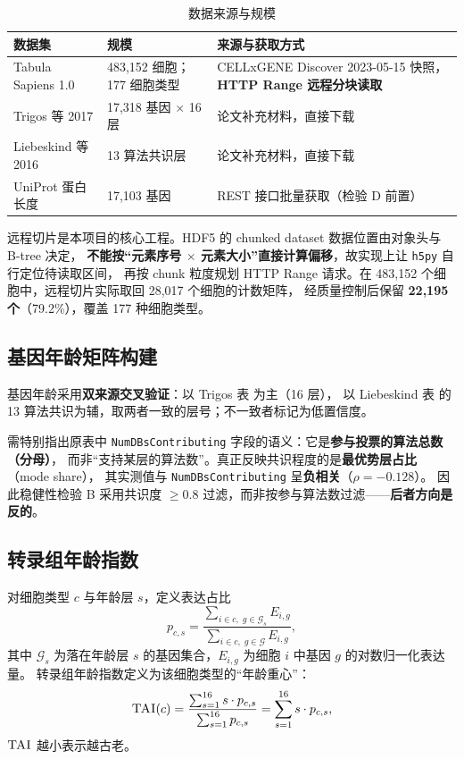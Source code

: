\documentclass[UTF8, a4paper, 11pt]{ctexart}
\newcommand{\tai}{\textsc{TAI}}
\begin{document}
\begin{table}[H]
  \centering
  \caption{数据来源与规模}
  \label{tab:data}
  \small
  \begin{tabularx}{\textwidth}{@{}p{3.0cm}p{3.1cm}X@{}}
    \toprule
    数据集 & 规模 & 来源与获取方式 \\
    \midrule
    Tabula Sapiens 1.0 & 483,152 细胞；177 细胞类型 & CELLxGENE Discover 2023-05-15 快照，\textbf{HTTP Range 远程分块读取}\citep{conservation2020} \\
    Trigos 等 2017 & 17,318 基因 $\times$ 16 层 & 论文补充材料，直接下载\citep{trigos2017} \\
    Liebeskind 等 2016 & 13 算法共识层 & 论文补充材料，直接下载\citep{liebeskind2016} \\
    UniProt 蛋白长度 & 17,103 基因 & REST 接口批量获取（检验 D 前置） \\
    \bottomrule
  \end{tabularx}
\end{table}

远程切片是本项目的核心工程。HDF5 的 chunked dataset 数据位置由对象头与 B-tree 决定，
\textbf{不能按“元素序号 $\times$ 元素大小”直接计算偏移}，故实现上让 \texttt{h5py} 自行定位待读取区间，
再按 chunk 粒度规划 HTTP Range 请求。在 483,152 个细胞中，远程切片实际取回 28,017 个细胞的计数矩阵，
经质量控制后保留 \textbf{22,195 个}（79.2\%），覆盖 177 种细胞类型。

\subsection{基因年龄矩阵构建}

基因年龄采用\textbf{双来源交叉验证}：以 Trigos 表\citep{trigos2017} 为主（16 层），
以 Liebeskind 表\citep{liebeskind2016} 的 13 算法共识为辅，取两者一致的层号；不一致者标记为低置信度。

需特别指出原表中 \texttt{NumDBsContributing} 字段的语义：它是\textbf{参与投票的算法总数（分母）}，
而非“支持某层的算法数”。真正反映共识程度的是\textbf{最优势层占比}（mode share），
其实测值与 \texttt{NumDBsContributing} 呈\textbf{负相关}（$\rho = -0.128$）。
因此稳健性检验 B 采用共识度 $\ge 0.8$ 过滤，而非按参与算法数过滤——\textbf{后者方向是反的}。

\subsection{转录组年龄指数}

对细胞类型 $c$ 与年龄层 $s$，定义表达占比
\begin{equation}
  p_{c,s} = \frac{\sum_{i \in c,\; g \in \mathcal{G}_s} E_{i,g}}{\sum_{i \in c,\; g \in \mathcal{G}} E_{i,g}},
  \label{eq:pcs}
\end{equation}
其中 $\mathcal{G}_s$ 为落在年龄层 $s$ 的基因集合，$E_{i,g}$ 为细胞 $i$ 中基因 $g$ 的对数归一化表达量。
转录组年龄指数定义为该细胞类型的“年龄重心”：
\begin{equation}
  \tai(c) = \frac{\sum_{s=1}^{16} s \cdot p_{c,s}}{\sum_{s=1}^{16} p_{c,s}} = \sum_{s=1}^{16} s \cdot p_{c,s},
  \label{eq:tai}
\end{equation}
$\tai$ 越小表示越古老。
\end{document}
